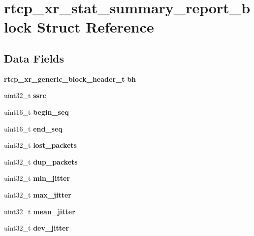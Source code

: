 \section{rtcp\+\_\+xr\+\_\+stat\+\_\+summary\+\_\+report\+\_\+block Struct Reference}
\label{structrtcp__xr__stat__summary__report__block}
\subsection*{Data Fields}
\begin{DoxyCompactItemize}
\item 
\mbox{\label{structrtcp__xr__stat__summary__report__block_a5ef04b1a2afd402cfea6488757aa890c}} 
\textbf{ rtcp\+\_\+xr\+\_\+generic\+\_\+block\+\_\+header\+\_\+t} {\bfseries bh}
\item 
\mbox{\label{structrtcp__xr__stat__summary__report__block_ae05dcd1316b0452218f8be76281399c2}} 
uint32\+\_\+t {\bfseries ssrc}
\item 
\mbox{\label{structrtcp__xr__stat__summary__report__block_a5c4cf0a0be1bdf5598d197c5c3162c47}} 
uint16\+\_\+t {\bfseries begin\+\_\+seq}
\item 
\mbox{\label{structrtcp__xr__stat__summary__report__block_aaa23d0172c2196780d0cf866a675e6aa}} 
uint16\+\_\+t {\bfseries end\+\_\+seq}
\item 
\mbox{\label{structrtcp__xr__stat__summary__report__block_a305e77bf8c2a3be27743f0ac675a5963}} 
uint32\+\_\+t {\bfseries lost\+\_\+packets}
\item 
\mbox{\label{structrtcp__xr__stat__summary__report__block_ac4669082eef9d61c8505586a6dac0e83}} 
uint32\+\_\+t {\bfseries dup\+\_\+packets}
\item 
\mbox{\label{structrtcp__xr__stat__summary__report__block_a128c8191929b5e2b11e32d65d593b1dd}} 
uint32\+\_\+t {\bfseries min\+\_\+jitter}
\item 
\mbox{\label{structrtcp__xr__stat__summary__report__block_aaa68cbf4705baa52b6057ba0c92d2f7a}} 
uint32\+\_\+t {\bfseries max\+\_\+jitter}
\item 
\mbox{\label{structrtcp__xr__stat__summary__report__block_ab969eafc1054e87db8b06711ad06a988}} 
uint32\+\_\+t {\bfseries mean\+\_\+jitter}
\item 
\mbox{\label{structrtcp__xr__stat__summary__report__block_aa84f4474ccafcdee7cbe4e763244b025}} 
uint32\+\_\+t {\bfseries dev\+\_\+jitter}
\item 
\mbox{\label{structrtcp__xr__stat__summary__report__block_a52c5e9443168405cea7f93e30d593913}} 

\end{DoxyCompactItemize}

